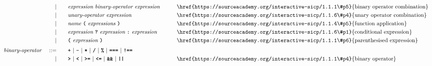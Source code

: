 \begin{alignat*}{9}
&&                       && |   &\quad &&  \textit{expression} \  \textit{binary-operator} \ 
                                            \textit{expression} \qquad
                                                           && \textrm{\href{https://sourceacademy.org/interactive-sicp/1.1.1\#p5}{binary operator combination}}\\
&&                       && |   &\quad &&   \textit{unary-operator} \ 
                                            \textit{expression}
                                                           && \textrm{\href{https://sourceacademy.org/interactive-sicp/1.1.6\#p4}{unary operator combination}}\\
&&                       && |   &\quad &&   \textit{name} \ 
                                            \textbf{\texttt{(}}\ \textit{expressions}\
                                            \textbf{\texttt{)}}
                                                           && \textrm{\href{https://sourceacademy.org/interactive-sicp/1.1.4\#p5}{function application}}\\
&&                       && |   &\quad &&   \textit{expression} \ \textbf{\texttt{?}}\ 
                                            \textit{expression}
                                            \ \textbf{\texttt{:}}\
                                            \textit{expression}\
                                                           && \textrm{\href{https://sourceacademy.org/interactive-sicp/1.1.6\#p1}{conditional expression}}\\
&&                       && |   &\quad &&  \textbf{\texttt{(}}\  \textit{expression} \ 
                                            \textbf{\texttt{)}} && \textrm{\href{https://sourceacademy.org/interactive-sicp/1.1.1\#p6}{parenthesised expression}}\\[1mm]
&& \textit{binary-operator}    \ 
                        && ::= &\quad && \textbf{\texttt{+}}\ |\ \textbf{\texttt{-}}\ |\ \textbf{\texttt{*}}\ |\ \textbf{\texttt{/}}\ |\ \textbf{\texttt{\%}}\ |\ 
                                   \textbf{\texttt{===}}\ |\ \textbf{\texttt{!==}}\ \\
&&                       && |  &\quad &&  \texttt{\textbf{>}}\ |\ \texttt{\textbf{<}}\ |\ \texttt{\textbf{>=}}\ |\ \texttt{\textbf{<=}}\
                                          |\ \textbf{\texttt{\&\&}}\ |\ \texttt{\textbf{||}}
                                          && \textrm{\href{https://sourceacademy.org/interactive-sicp/1.1.1\#p4}{binary operator}}\\[1mm]

\end{alignat*}

